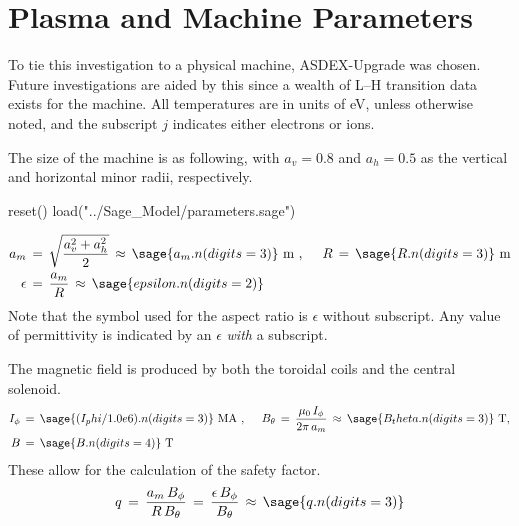 \chapter{Plasma and Machine Parameters}\label{chapter:Plasma_Parameters}
To tie this investigation to a physical machine, ASDEX-Upgrade was chosen.
Future investigations are aided by this since a wealth of L--H transition data exists for the machine.
All temperatures are in units of eV, unless otherwise noted, and the subscript $j$ indicates either electrons or ions.

The size of the machine is as following, with $a_v = 0.8$ and $a_h = 0.5$ as the vertical and horizontal minor radii, respectively.
\begin{sagesilent}
	reset()
	load("../Sage_Model/parameters.sage")
\end{sagesilent}
\begin{align} %
	a_m \,&=\, \sqrt{\frac{a_v^2 + a_h^2}{2}} \,\approx\,
		\sage{a_m.n(digits=3)}~\text{m}~,~~~~
		R \,=\, \sage{R.n(digits=3)}~\text{m} \\
		\epsilon \,&=\, \frac{a_m}{R} \,\approx\, \sage{epsilon.n(digits=2)}
\end{align}
Note that the symbol used for the aspect ratio is $\epsilon$ without subscript.
Any value of permittivity is indicated by an $\epsilon$ \emph{with} a subscript.

The magnetic field is produced by both the toroidal coils and the central solenoid.
\begin{align} %
	I_\phi \,&=\, \sage{(I_phi/1.0e6).n(digits=3)}~\text{MA}~,~~~~
		B_\theta \,=\, \frac{\mu_0 \, I_\phi}{2\pi \, a_m} \,\approx\,
		\sage{B_theta.n(digits=3)}~\text{T}, \\
	B \,&=\, \sage{B.n(digits=4)}~\text{T}
\end{align}
These allow for the calculation of the safety factor.
\begin{align} %
	q \,=\, \frac{a_m \, B_\phi}{R \, B_\theta} \,=\,
		\frac{\epsilon \, B_\phi}{B_\theta} \,\approx\, \sage{q.n(digits=3)}
		\label{eq:safety_factor}
\end{align}

